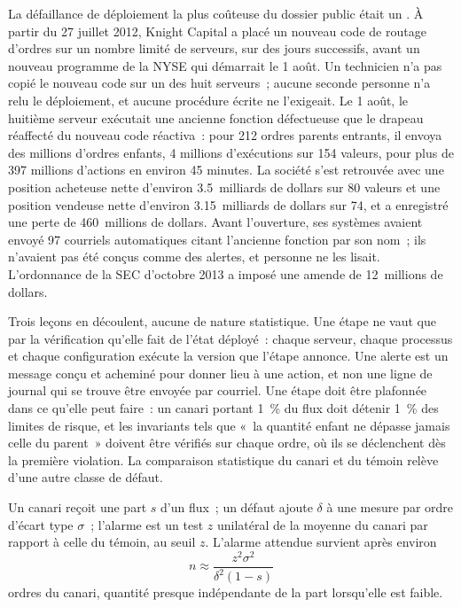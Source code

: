 La défaillance de déploiement la plus coûteuse du dossier public était un . À partir du 27 juillet 2012, Knight Capital a placé un nouveau code de routage d'ordres sur
un nombre limité de serveurs, sur des jours successifs, avant un nouveau programme de la NYSE qui démarrait le 1 août. Un technicien n'a pas copié le nouveau code sur
un des huit serveurs~; aucune seconde personne n'a relu le déploiement, et aucune procédure écrite ne l'exigeait. Le 1 août, le huitième serveur exécutait une ancienne fonction défectueuse que
le drapeau réaffecté du nouveau code réactiva~: pour 212 ordres parents entrants, il envoya des millions d'ordres enfants, 4 millions d'exécutions sur 154 valeurs, pour plus de
397 millions d'actions en environ 45 minutes. La société s'est retrouvée avec une position acheteuse nette d'environ 3.5~milliards de dollars sur 80 valeurs et une position vendeuse nette d'environ 3.15~milliards de dollars sur
74, et a enregistré une perte de 460~millions de dollars. Avant l'ouverture, ses systèmes avaient envoyé 97 courriels automatiques citant l'ancienne fonction par son nom~; ils n'avaient pas été conçus comme
des alertes, et personne ne les lisait. L'ordonnance de la SEC d'octobre 2013 a imposé une amende de 12~millions de dollars.

Trois leçons en découlent, aucune de nature statistique. Une étape ne vaut que par la vérification qu'elle fait de l'état déployé~: chaque serveur, chaque processus et chaque configuration exécute la
version que l'étape annonce. Une alerte est un message conçu et acheminé pour donner lieu à une action, et non une ligne de journal qui se trouve être envoyée par courriel. Une étape doit être plafonnée
dans ce qu'elle peut faire~: un canari portant 1~\% du flux doit détenir 1~\% des limites de risque, et les invariants tels que «~la quantité enfant ne dépasse jamais celle du parent~» doivent être
vérifiés sur chaque ordre, où ils se déclenchent dès la première violation. La comparaison statistique du canari et du témoin relève d'une autre classe de défaut.

\begin{proposition}\label{prop:rs:live-experiments:canary}
Un canari reçoit une part $s$ d'un flux~; un défaut ajoute $\delta$ à une mesure par ordre d'écart type $\sigma$~; l'alarme est un test $z$ unilatéral de la
moyenne du canari par rapport à celle du témoin, au seuil $z$. L'alarme attendue survient après environ
\[
n \approx \frac{z^2\sigma^2}{\delta^2(1 - s)}
\]
ordres du canari, quantité presque indépendante de la part lorsqu'elle est faible.
\end{proposition}

